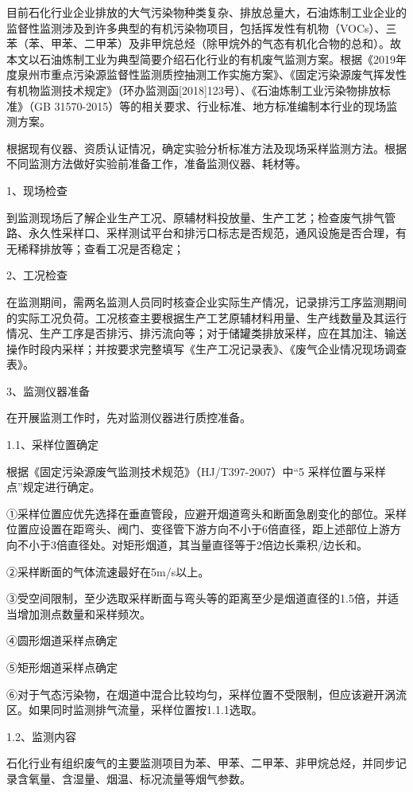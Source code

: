 \documentclass[
]{book}
\begin{document}
目前石化行业企业排放的大气污染物种类复杂、排放总量大，石油炼制工业企业的监督性监测涉及到许多典型的有机污染物项目，包括挥发性有机物（VOCs）、三苯（苯、甲苯、二甲苯）及非甲烷总烃（除甲烷外的气态有机化合物的总和）。故本文以石油炼制工业为典型简要介绍石化行业的有机废气监测方案。根据《2019年度泉州市重点污染源监督性监测质控抽测工作实施方案》、《固定污染源废气挥发性有机物监测技术规定》（环办监测函{[}2018{]}123号）、《石油炼制工业污染物排放标准》（GB 31570-2015）等的相关要求、行业标准、地方标准编制本行业的现场监测方案。

根据现有仪器、资质认证情况，确定实验分析标准方法及现场采样监测方法。根据不同监测方法做好实验前准备工作，准备监测仪器、耗材等。

1、现场检查

到监测现场后了解企业生产工况、原辅材料投放量、生产工艺；检查废气排气管路、永久性采样口、采样测试平台和排污口标志是否规范，通风设施是否合理，有无稀释排放等；查看工况是否稳定；

2、工况检查

在监测期间，需两名监测人员同时核查企业实际生产情况，记录排污工序监测期间的实际工况负荷。工况核查主要根据生产工艺原辅材料用量、生产线数量及其运行情况、生产工序是否排污、排污流向等；对于储罐类排放采样，应在其加注、输送操作时段内采样；并按要求完整填写《生产工况记录表》、《废气企业情况现场调查表》。

3、监测仪器准备

在开展监测工作时，先对监测仪器进行质控准备。

1.1、采样位置确定

根据《固定污染源废气监测技术规范》（HJ/T397-2007）中``5 采样位置与采样点''规定进行确定。

①采样位置应优先选择在垂直管段，应避开烟道弯头和断面急剧变化的部位。采样位置应设置在距弯头、阀门、变径管下游方向不小于6倍直径，距上述部位上游方向不小于3倍直径处。对矩形烟道，其当量直径等于2倍边长乘积/边长和。

②采样断面的气体流速最好在5m/s以上。

③受空间限制，至少选取采样断面与弯头等的距离至少是烟道直径的1.5倍，并适当增加测点数量和采样频次。

④圆形烟道采样点确定

⑤矩形烟道采样点确定

⑥对于气态污染物，在烟道中混合比较均匀，采样位置不受限制，但应该避开涡流区。如果同时监测排气流量，采样位置按1.1.1选取。

1.2、监测内容

石化行业有组织废气的主要监测项目为苯、甲苯、二甲苯、非甲烷总烃，并同步记录含氧量、含湿量、烟温、标况流量等烟气参数。
\end{document}

